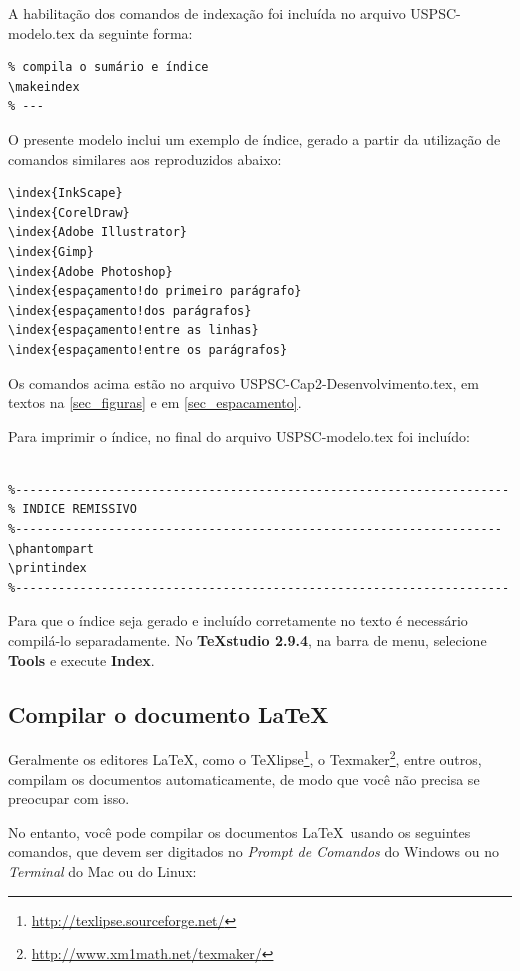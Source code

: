 A habilitação dos comandos de indexação foi incluída no arquivo USPSC-modelo.tex da seguinte forma:


\begin{verbatim}
% compila o sumário e índice
\makeindex
% ---
\end{verbatim}

O presente modelo inclui um exemplo de índice, gerado a partir da utilização de comandos similares aos reproduzidos abaixo:

\begin{verbatim}
\index{InkScape}
\index{CorelDraw}
\index{Adobe Illustrator}
\index{Gimp}
\index{Adobe Photoshop}
\index{espaçamento!do primeiro parágrafo}
\index{espaçamento!dos parágrafos}
\index{espaçamento!entre as linhas}
\index{espaçamento!entre os parágrafos}
\end{verbatim}

Os comandos acima estão no arquivo USPSC-Cap2-Desenvolvimento.tex, em textos na  \autoref{sec_figuras} e em \autoref{sec_espacamento}.

Para imprimir o índice, no final do arquivo USPSC-modelo.tex foi incluído:

\begin{verbatim}

%---------------------------------------------------------------------
% INDICE REMISSIVO
%--------------------------------------------------------------------
\phantompart
\printindex
%---------------------------------------------------------------------
\end{verbatim}

Para que o índice seja gerado e incluído corretamente no texto é necessário compilá-lo separadamente. No \textbf{TeXstudio 2.9.4}, na barra de menu, selecione \textbf{Tools} e execute \textbf{Index}.


\subsection{Compilar o documento \LaTeX}

Geralmente os editores \LaTeX, como o
TeXlipse\footnote{\url{http://texlipse.sourceforge.net/}}, o
Texmaker\footnote{\url{http://www.xm1math.net/texmaker/}}, entre outros,
compilam os documentos automaticamente, de modo que você não precisa se
preocupar com isso.

No entanto, você pode compilar os documentos \LaTeX\ usando os seguintes
comandos, que devem ser digitados no \emph{Prompt de Comandos} do Windows ou no
\emph{Terminal} do Mac ou do Linux:

